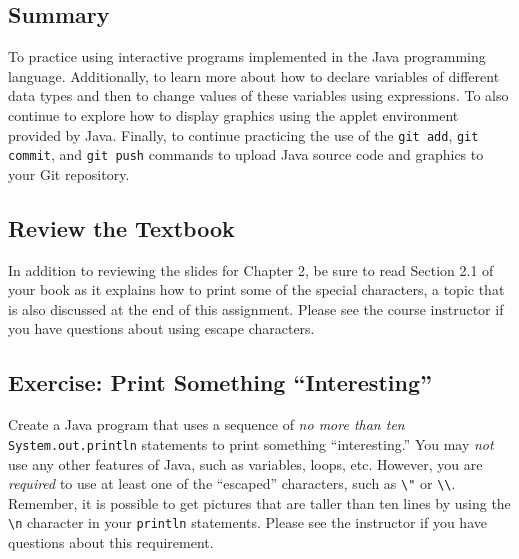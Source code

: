 


\subsection*{Summary}

To practice using interactive programs implemented in the Java programming language. Additionally, to learn more about
how to declare variables of different data types and then to change values of these variables using expressions.  To
also continue to explore how to display graphics using the applet environment provided by Java. Finally, to continue
practicing the use of the {\tt git add}, {\tt git commit}, and {\tt git push} commands to upload Java source code and
graphics to your Git repository.

\vspace*{-.1in}
\subsection*{Review the Textbook}

In addition to reviewing the slides for Chapter 2, be sure to read Section 2.1 of your book as it explains how
to print some of the special characters, a topic that is also discussed at the end of this assignment. Please see the
course instructor if you have questions about using escape characters.

\vspace*{-.1in}
\subsection*{Exercise: Print Something ``Interesting''}

Create a Java program that uses a sequence of {\em no more than ten} {\tt System.out.println} statements to print
something ``interesting.'' You may {\em not} use any other features of Java, such as variables, loops, etc.  However,
you are {\em required} to use at least one of the ``escaped'' characters, such as \verb$\"$ or \verb$\\$.  Remember, it
is possible to get pictures that are taller than ten lines by using the \verb$\n$ character in your {\tt println}
statements. Please see the instructor if you have questions about this requirement.

